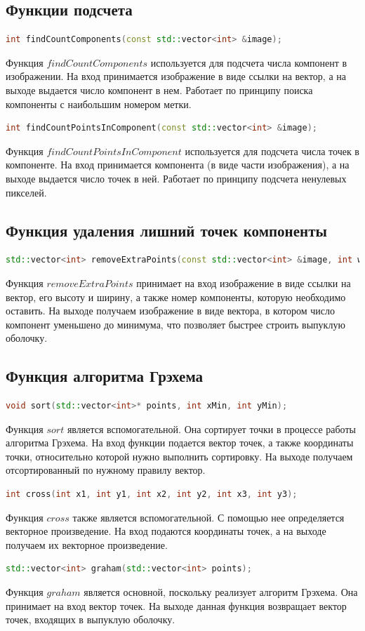 \documentclass[a4paper, 12pt]{extarticle}
\begin{document}
	\subsection{Функции подсчета}
	\begin{lstlisting}[language=C++]
		int findCountComponents(const std::vector<int> &image);
	\end{lstlisting}
	Функция $findCountComponents$ используется для подсчета числа компонент в изображении. На вход принимается изображение в виде ссылки на вектор, а на выходе выдается число компонент в нем. Работает по принципу поиска компоненты с наибольшим номером метки.
	\begin{lstlisting}[language=C++]
		int findCountPointsInComponent(const std::vector<int> &image);
	\end{lstlisting}
	Функция $findCountPointsInComponent$ используется для подсчета числа точек в компоненте. На вход принимается компонента (в виде части изображения), а на выходе выдается число точек в ней. Работает по принципу подсчета ненулевых пикселей.
	
	\subsection{Функция удаления лишний точек компоненты}
	\begin{lstlisting}[language=C++]
		std::vector<int> removeExtraPoints(const std::vector<int> &image, int width, int height, int component);
	\end{lstlisting}
	Функция $removeExtraPoints$ принимает на вход изображение в виде ссылки на вектор, его высоту и ширину, а также номер компоненты, которую необходимо оставить. На выходе получаем изображение в виде вектора, в котором число компонент уменьшено до минимума, что позволяет быстрее строить выпуклую оболочку.
	
	\subsection{Функция алгоритма Грэхема}
	\begin{lstlisting}[language=C++]
		void sort(std::vector<int>* points, int xMin, int yMin);
	\end{lstlisting}
	Функция $sort$ является вспомогательной. Она сортирует точки в процессе работы алгоритма Грэхема. На вход функции подается вектор точек, а также координаты точки, относительно которой нужно выполнить сортировку. На выходе получаем отсортированный по нужному правилу вектор.
	\begin{lstlisting}[language=C++]
		int cross(int x1, int y1, int x2, int y2, int x3, int y3);
	\end{lstlisting}
	Функция $cross$ также является вспомогательной. С помощью нее определяется векторное произведение. На вход подаются координаты точек, а на выходе получаем их векторное произведение.
	\begin{lstlisting}[language=C++]
		std::vector<int> graham(std::vector<int> points);
	\end{lstlisting}
	Функция $graham$ является основной, поскольку реализует алгоритм Грэхема. Она принимает на вход вектор точек. На выходе данная функция возвращает вектор точек, входящих в выпуклую оболочку.
	
\end{document}
